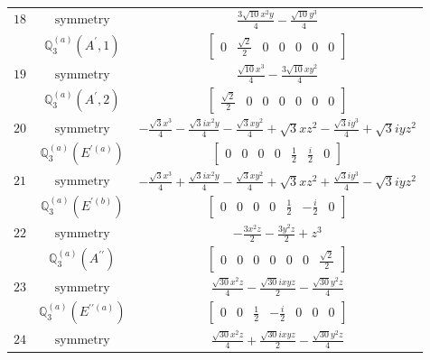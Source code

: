 \documentclass[fleqn,8pt,landscape]{jsarticle}
\begin{document}
\begin{longtable}{ccc}
$ 18 $ & $ \text{symmetry} $ & $ \frac{3 \sqrt{10} x^{2} y}{4} - \frac{\sqrt{10} y^{3}}{4} $ \\
$  $ & $ \mathbb{Q}_{3}^{(a)}(A^{\prime},1) $ & $ \begin{bmatrix} 0 & \frac{\sqrt{2}}{2} & 0 & 0 & 0 & 0 & 0 \end{bmatrix} $ \\ \hline
$ 19 $ & $ \text{symmetry} $ & $ \frac{\sqrt{10} x^{3}}{4} - \frac{3 \sqrt{10} x y^{2}}{4} $ \\
$  $ & $ \mathbb{Q}_{3}^{(a)}(A^{\prime},2) $ & $ \begin{bmatrix} \frac{\sqrt{2}}{2} & 0 & 0 & 0 & 0 & 0 & 0 \end{bmatrix} $ \\ \hline
$ 20 $ & $ \text{symmetry} $ & $ - \frac{\sqrt{3} x^{3}}{4} - \frac{\sqrt{3} i x^{2} y}{4} - \frac{\sqrt{3} x y^{2}}{4} + \sqrt{3} x z^{2} - \frac{\sqrt{3} i y^{3}}{4} + \sqrt{3} i y z^{2} $ \\
$  $ & $ \mathbb{Q}_{3}^{(a)}(E^{\prime(a)}) $ & $ \begin{bmatrix} 0 & 0 & 0 & 0 & \frac{1}{2} & \frac{i}{2} & 0 \end{bmatrix} $ \\ \hline
$ 21 $ & $ \text{symmetry} $ & $ - \frac{\sqrt{3} x^{3}}{4} + \frac{\sqrt{3} i x^{2} y}{4} - \frac{\sqrt{3} x y^{2}}{4} + \sqrt{3} x z^{2} + \frac{\sqrt{3} i y^{3}}{4} - \sqrt{3} i y z^{2} $ \\
$  $ & $ \mathbb{Q}_{3}^{(a)}(E^{\prime(b)}) $ & $ \begin{bmatrix} 0 & 0 & 0 & 0 & \frac{1}{2} & - \frac{i}{2} & 0 \end{bmatrix} $ \\ \hline
$ 22 $ & $ \text{symmetry} $ & $ - \frac{3 x^{2} z}{2} - \frac{3 y^{2} z}{2} + z^{3} $ \\
$  $ & $ \mathbb{Q}_{3}^{(a)}(A^{\prime\prime}) $ & $ \begin{bmatrix} 0 & 0 & 0 & 0 & 0 & 0 & \frac{\sqrt{2}}{2} \end{bmatrix} $ \\ \hline
$ 23 $ & $ \text{symmetry} $ & $ \frac{\sqrt{30} x^{2} z}{4} - \frac{\sqrt{30} i x y z}{2} - \frac{\sqrt{30} y^{2} z}{4} $ \\
$  $ & $ \mathbb{Q}_{3}^{(a)}(E^{\prime\prime(a)}) $ & $ \begin{bmatrix} 0 & 0 & \frac{1}{2} & - \frac{i}{2} & 0 & 0 & 0 \end{bmatrix} $ \\ \hline
$ 24 $ & $ \text{symmetry} $ & $ \frac{\sqrt{30} x^{2} z}{4} + \frac{\sqrt{30} i x y z}{2} - \frac{\sqrt{30} y^{2} z}{4} $ \\

\end{longtable}
\end{document}
